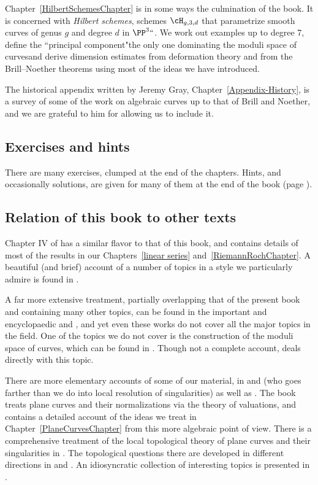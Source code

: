 Chapter~\ref{HilbertSchemesChapter} is in some ways the culmination of the book. It is concerned with \emph{Hilbert schemes}, schemes $\cH_{g,3,d}$ that parametrize smooth curves of genus $g$ and degree $d$  in $\PP^3` `$. We work out examples up to degree 7, define the ``principal component"\emdash the only one dominating the moduli space of curves\emdash and derive dimension estimates from deformation theory and from the Brill--Noether theorems
using most of the ideas we have introduced. 

The historical appendix written by Jeremy Gray, Chapter~\ref{Appendix-History},  is a survey of some of the work on
algebraic curves up to that of Brill and Noether, and we are grateful to him for allowing us to include it.

\subsection*{Exercises and hints}

There are many exercises, clumped at the end of the chapters. Hints,
and occasionally solutions, are given for many of them at the end of
the book (page \pageref{hints}).

\subsection*{Relation of this book to other texts} 
Chapter IV of \cite{Hartshorne1977} has a similar flavor to that of this book, and contains details of most of the 
results in our Chapters~\ref{linear series} and~\ref{RiemannRochChapter}. A beautiful (and brief) account of a number of topics in a style we particularly admire is found in \cite{MumfordCJ}.

A far more extensive treatment, partially overlapping that of the present book and containing many other topics, can be found in the important and encyclopaedic \cite{ACGH} and \cite{ACG}, and yet even these works do not cover all the major topics in the field. 
One of the topics we do not cover is the construction of the moduli space of curves, which can be found
in \cite{ACG}. Though not a complete account, \cite{HarrisMorrison1998} deals directly with this
topic. 

There are more elementary accounts of some of our material, in \cite{Fulton1989} and \cite{Walker1978} (who goes farther than we do into local resolution of singularities) as well as \cite{Griffiths-curves}. The book \cite{Kunz} treats plane curves and their normalizations via the theory of valuations, and contains a detailed  account of the ideas we treat in Chapter~\ref{PlaneCurvesChapter} from this more algebraic point of view.  There is a comprehensive treatment of the local topological theory of plane curves and their singularities in \cite{Brieskorn1986}. The topological questions there are developed in different directions in \cite{MR0239612} %
 and \cite{MR817982}. %
 An  idiosyncratic collection of interesting topics is presented in \cite{Clemens-Scrapbook}.

